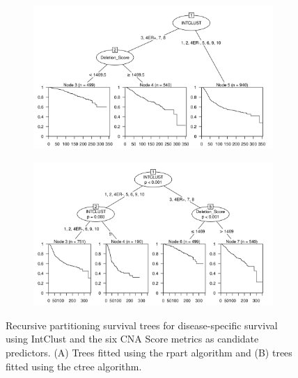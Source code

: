 \begin{figure}[!h]
\centering

\vspace{0.5cm}

\begin{subfigure}{\textwidth}
\subcaption{}
\includegraphics[width=1\textwidth]{../figures/Chapter_3/PartyKit_Survival_Score_DSS_INTCLUST.png}
\end{subfigure}

\vspace{2cm}

\begin{subfigure}{\textwidth}
\subcaption{}
\includegraphics[width=1\textwidth]{../figures/Chapter_3/Ctree_Survival_Score_DSS_INTCLUST.png}
\end{subfigure}

\vspace{0.5cm}

\caption[Recursive partitioning survival trees for disease-specific survival using IntClust and the six CNA Score metrics as candidate predictors.]{Recursive partitioning survival trees for disease-specific survival using IntClust and the six CNA Score metrics as candidate predictors. (A) Trees fitted using the rpart algorithm and (B) trees fitted using the ctree algorithm.}
\label{fig:INTCLUST_CNA_Score_DSS}
\end{figure}


